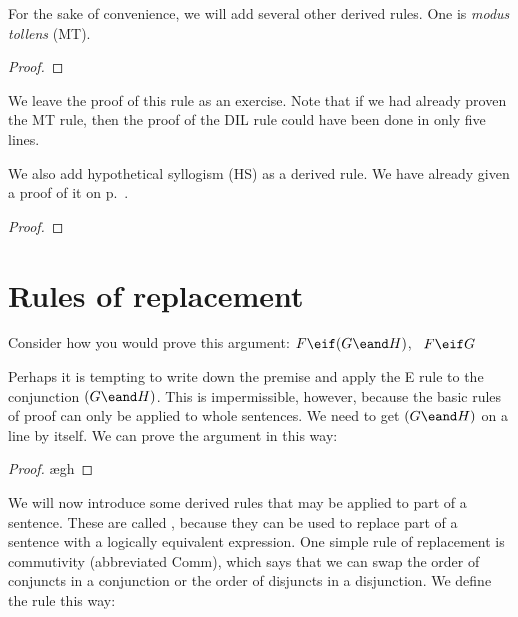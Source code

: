 For the sake of convenience, we will add several other derived rules. One is \emph{modus tollens} (MT).

\begin{proof}
	 
\end{proof}

We leave the proof of this rule as an exercise. Note that if we had already proven the MT rule, then the proof of the DIL rule could have been done in only five lines.

We also add hypothetical syllogism (HS) as a derived rule. We have already given a proof of it on p.~\pageref{HSproof}.

\begin{proof}
\end{proof}


\section{Rules of replacement}
Consider how you would prove this argument: $F\eif(G\eand H)$, \therefore\ $F\eif G$

Perhaps it is tempting to write down the premise and apply the {\eand}E rule to the conjunction $(G \eand H)$. This is impermissible, however, because the basic rules of proof can only be applied to whole sentences. We need to get $(G \eand H)$ on a line by itself. We can prove the argument in this way:



\begin{proof}
	\open
		\ae{gh}
	\close
\end{proof}

We will now introduce some derived rules that may be applied to part of a sentence. These are called , because they can be used to replace part of a sentence with a logically equivalent expression. One simple rule of replacement is commutivity (abbreviated Comm), which says that we can swap the order of conjuncts in a conjunction or the order of disjuncts in a disjunction. We define the rule this way:

